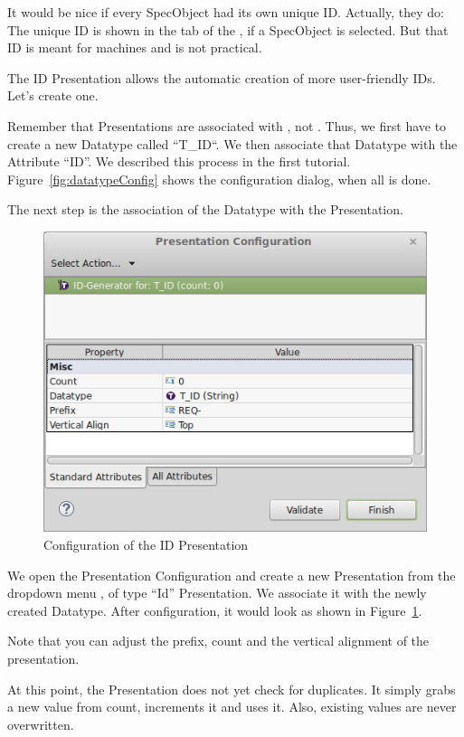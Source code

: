It would be nice if every SpecObject had its own unique ID.  Actually, they do: The unique ID is shown in the  tab of the , if a SpecObject is selected.  But that ID is meant for machines and is not practical.

The ID Presentation allows the automatic creation of more user-friendly IDs.  Let's create one.

Remember that Presentations are associated with , not .  Thus, we first have to create a new Datatype called ``T\_ID``.  We then associate that Datatype with the Attribute ``ID''.  We described this process in the first tutorial.  Figure~\ref{fig:datatypeConfig} shows the configuration dialog, when all is done.

The next step is the association of the Datatype with the Presentation.

\begin{figure}
\centering      
\includegraphics[width=0.8\linewidth]{../rmf-images/presentation_id.png}      
\caption{Configuration of the ID Presentation}
\label{fig:idConfig}
\end{figure}

We open the Presentation Configuration and create a new Presentation from the dropdown menu , of type ``Id'' Presentation.  We associate it with the newly created Datatype.  After configuration, it would look as shown in Figure~\ref{fig:idConfig}.

Note that you can adjust the prefix, count and the vertical alignment of the presentation.

\begin{warning}
At this point, the Presentation does not yet check for duplicates.  It simply grabs a new value from count, increments it and uses it.  Also, existing values are never overwritten.
\end{warning}

